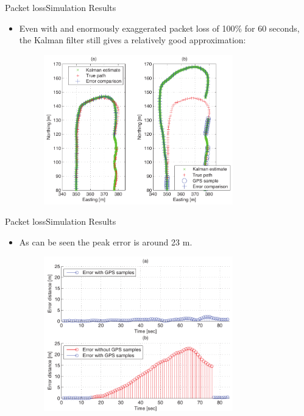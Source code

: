 
	\begin{frame}{Packet loss}{Simulation Results}
	  \begin{itemize}
	  	\item Even with and enormously exaggerated packet loss of 100\% for 60 seconds, the Kalman filter still gives a relatively good approximation:
		\begin{figure}
			\begin{center}
				\includegraphics[width=8.2cm]{img/track}
				\label{fig:packetloss}
			\end{center}
		\end{figure}
	  \end{itemize}
	\end{frame}


	\begin{frame}{Packet loss}{Simulation Results}
		\begin{itemize}
		  	\item As can be seen the peak error is around 23 m.
			\begin{figure}
				\begin{center}
					\includegraphics[width=8.2cm]{img/error}
					\label{fig:error}
				\end{center}
			\end{figure}
		\end{itemize}
	\end{frame}

